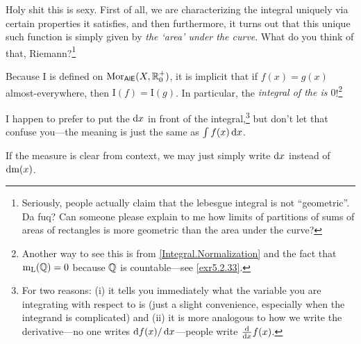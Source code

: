 \begin{thm}[Integral]
\begin{savenotes}
\begin{rmk}
Holy shit this is sexy.  First of all, we are characterizing the integral uniquely via certain properties it satisfies, and then furthermore, it turns out that this unique such function is simply given by \emph{the `area' under the curve}.  What do you think of that, Riemann?\footnote{Seriously, people actually claim that the lebesgue integral is not ``geometric''.  Da fuq?  Can someone please explain to me how limits of partitions of sums of areas of rectangles is more geometric than the area under the curve?}
\end{rmk}
\begin{rmk}
Because $\mathrm{I}$ is defined on $\operatorname{Mor} _{\mathsf{AlE}}(X,\mathbb{R} _0^+)$, it is implicit that if $f(x)=g(x)$ almost-everywhere, then $\mathrm{I}(f)=\mathrm{I}(g)$.  In particular, the \emph{integral of the  is $0$}!\footnote{Another way to see this is from \ref{Integral.Normalization} and the fact that $\mathrm{m} _{\mathrm{L}}(\mathbb{Q} )=0$ because $\mathbb{Q}$ is countable---see \cref{exr5.2.33}.}
\end{rmk}
\begin{rmk}
I happen to prefer to put the $\mathop{}\!\mathrm{d} x$ in front of the integral,\footnote{For two reasons:  (i) it tells you immediately what the variable you are integrating with respect to is (just a slight convenience, especially when the integrand is complicated) and (ii) it is more analogous to how we write the derivative---no one writes $\mathop{}\!\mathrm{d} f(x)/\mathop{}\!\mathrm{d} x$---people write $\frac{\mathop{}\!\mathrm{d}}{\mathop{}\!\mathrm{d} x}f(x)$.} but don't let that confuse you---the meaning is just the same as $\int f(x)\mathop{}\!\mathrm{d} x$.
\end{rmk}
\begin{rmk}
If the measure is clear from context, we may just simply write $\mathop{}\!\mathrm{d} x$ instead of $\mathop{}\!\mathrm{d} \mathrm{m} (x)$.
\end{rmk}
\begin{rmk}

\end{rmk}
\end{savenotes}
\end{thm}
